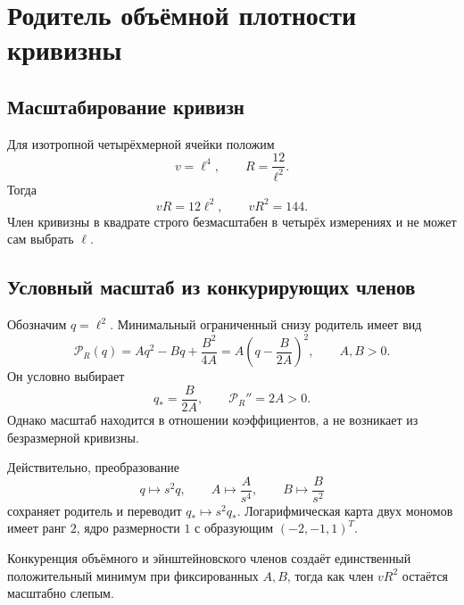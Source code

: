 \chapter{Родитель объёмной плотности кривизны}
\label{ch:v10-cell-birth-four-volume-curvature-density-parent}

\section{Масштабирование кривизн}

Для изотропной четырёхмерной ячейки положим
\begin{equation}
 v=\ell^4,
 \qquad R=\frac{12}{\ell^2}.
\end{equation}
Тогда
\begin{equation}
 vR=12\ell^2,
 \qquad vR^2=144.
 \label{eq:v10-curvature-density-scaling}
\end{equation}
Член кривизны в квадрате строго безмасштабен в четырёх измерениях и не
может сам выбрать $\ell$.

\section{Условный масштаб из конкурирующих членов}

Обозначим $q=\ell^2$. Минимальный ограниченный снизу родитель имеет вид
\begin{equation}
 \mathcal P_R(q)=Aq^2-Bq+\frac{B^2}{4A}
 =A\left(q-\frac{B}{2A}\right)^2,
 \qquad A,B>0.
 \label{eq:v10-curvature-density-parent}
\end{equation}
Он условно выбирает
\begin{equation}
 q_*=\frac{B}{2A},
 \qquad \mathcal P_R''=2A>0.
 \label{eq:v10-curvature-density-selected-scale}
\end{equation}
Однако масштаб находится в отношении коэффициентов, а не возникает из
безразмерной кривизны.

Действительно, преобразование
\begin{equation}
 q\mapsto s^2q,
 \qquad A\mapsto\frac{A}{s^4},
 \qquad B\mapsto\frac{B}{s^2}
 \label{eq:v10-curvature-coefficient-orbit}
\end{equation}
сохраняет родитель и переводит $q_*\mapsto s^2q_*$. Логарифмическая карта
двух мономов имеет ранг $2$, ядро размерности $1$ с образующим
$(-2,-1,1)^T$.

\begin{theorem}
Конкуренция объёмного и эйнштейновского членов создаёт единственный
положительный минимум при фиксированных $A,B$, тогда как член $vR^2$
остаётся масштабно слепым.
\end{theorem}

